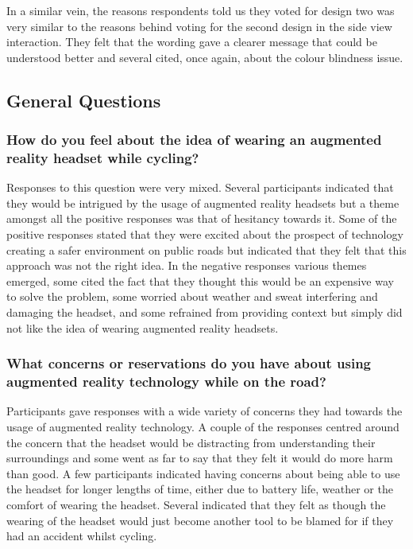 \documentclass{l4proj}
\begin{document}
In a similar vein, the reasons respondents told us they voted for design two was very similar to the reasons behind voting for the second design in the side view interaction. They felt that the wording gave a clearer message that could be understood better and several cited, once again, about the colour blindness issue.

\subsection{General Questions}

\subsubsection{How do you feel about the idea of wearing an augmented reality headset while cycling?}

Responses to this question were very mixed. Several participants indicated that they would be intrigued by the usage of augmented reality headsets but a theme amongst all the positive responses was that of hesitancy towards it. Some of the positive responses stated that they were excited about the prospect of technology creating a safer environment on public roads but indicated that they felt that this approach was not the right idea. In the negative responses various themes emerged, some cited the fact that they thought this would be an expensive way to solve the problem, some worried about weather and sweat interfering and damaging the headset, and some refrained from providing context but simply did not like the idea of wearing augmented reality headsets.

\subsubsection{What concerns or reservations do you have about using augmented reality technology while on the road?}

Participants gave responses with a wide variety of concerns they had towards the usage of augmented reality technology. A couple of the responses centred around the concern that the headset would be distracting from understanding their surroundings and some went as far to say that they felt it would do more harm than good. A few participants indicated having concerns about being able to use the headset for longer lengths of time, either due to battery life, weather or the comfort of wearing the headset. Several indicated that they felt as though the wearing of the headset would just become another tool to be blamed for if they had an accident whilst cycling.
\end{document}
